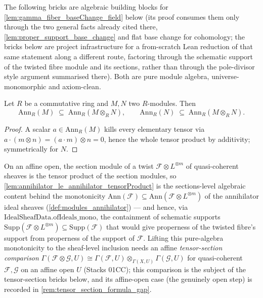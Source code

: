 The following bricks are algebraic building blocks for
\cref{lem:gamma_fiber_baseChange_field} below (its proof consumes them only
through the two general facts already cited there,
\cref{lem:proper_support_base_change} and flat base change for cohomology;
the bricks below are project infrastructure for a from-scratch Lean
reduction of that same statement along a different route, factoring through
the schematic support of the twisted fibre module and its sections, rather
than through the pole-divisor style argument summarised there). Both are
pure module algebra, universe-monomorphic and axiom-clean.

\begin{lemma}
  \label{lem:annihilator_le_annihilator_tensorProduct}
  Let \(R\) be a commutative ring and \(M, N\) two \(R\)-modules. Then
  \[
    \mathrm{Ann}_R(M) \;\subseteq\; \mathrm{Ann}_R(M \otimes_R N),
    \qquad
    \mathrm{Ann}_R(N) \;\subseteq\; \mathrm{Ann}_R(M \otimes_R N).
  \]
\end{lemma}
\begin{proof}\leanok
  A scalar \(a \in \mathrm{Ann}_R(M)\) kills every elementary tensor via
  \(a \cdot (m \otimes n) = (a \cdot m) \otimes n = 0\), hence the whole tensor
  product by additivity; symmetrically for \(N\).
\end{proof}

\begin{remark}
  \label{rem:annihilator_tensorProduct_support}
  On an affine open, the section module of a twist \(\mathcal F \otimes
  L^{\otimes m}\) of quasi-coherent sheaves is the tensor product of the
  section modules, so \cref{lem:annihilator_le_annihilator_tensorProduct}
  is the sections-level algebraic content behind the monotonicity
  \(\mathrm{Ann}(\mathcal F) \subseteq \mathrm{Ann}(\mathcal F \otimes
  L^{\otimes m})\) of the annihilator ideal sheaves
  (\cref{def:modules_annihilator}) --- and hence, via
  \(\mathrm{IdealSheafData.ofIdeals\_mono}\), the containment of schematic
  supports \(\mathrm{Supp}(\mathcal F \otimes L^{\otimes m}) \subseteq
  \mathrm{Supp}(\mathcal F)\) that would give properness of the twisted
  fibre's support from properness of the support of \(\mathcal F\). Lifting
  this pure-algebra monotonicity to the sheaf-level inclusion needs an
  affine \emph{tensor-section comparison}
  \(\Gamma(\mathcal F \otimes \mathcal G, U) \cong \Gamma(\mathcal F, U)
  \otimes_{\Gamma(X, U)} \Gamma(\mathcal G, U)\) for quasi-coherent
  \(\mathcal F, \mathcal G\) on an affine open \(U\) (Stacks 01CC); this
  comparison is the subject of the tensor-section bricks below, and its
  affine-open case (the genuinely open step) is recorded in
  \cref{rem:tensor_section_formula_gap}.
\end{remark}

